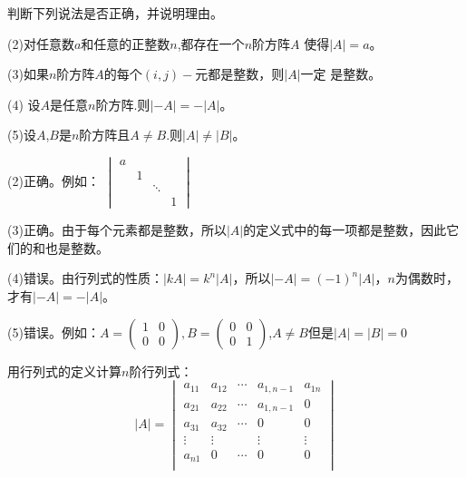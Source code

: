\documentclass[a4paper]{report}
\begin{document}
\EX 判断下列说法是否正确，并说明理由。

(2)对任意数$a$和任意的正整数$n$,都存在一个$n$阶方阵$A$
使得$|A|=a$。

(3)如果$n$阶方阵$A$的每个$(i,j)-$元都是整数，则$|A|$一定
是整数。

(4) 设$A$是任意$n$阶方阵.则$|-A|=-|A|$。

(5)设$A$,$B$是$n$阶方阵且$A\neq B$.则$|A|\neq |B|$。

\begin{jie}
(2)正确。例如：
$
\begin{vmatrix}
 a&&&\\
 &1&&\\
 &&\ddots&\\
 &&&1
\end{vmatrix}$

(3)正确。由于每个元素都是整数，所以$|A|$的定义式中的每一项都是整数，因此它们的和也是整数。

(4)错误。由行列式的性质：$|kA|=k^{n}|A|$，所以$|-A|=(-1)^n|A|$，$n$为偶数时，才有$|-A|=-|A|$。

(5)错误。例如：$A=
\begin{pmatrix}
1&0\\
0&0
\end{pmatrix},B=
\begin{pmatrix}
0&0\\
0&1
\end{pmatrix}
$,$A\neq B$但是$|A|=|B|=0$
\end{jie}

\EX 用行列式的定义计算$n$阶行列式：
\begin{equation*}
|A|=
\begin{vmatrix}
a_{11}&a_{12}&\cdots&a_{1,n-1}&a_{1n}\\
a_{21}&a_{22}&\cdots&a_{1,n-1}&0\\
a_{31}&a_{32}&\cdots&0&0\\
\vdots&\vdots&&\vdots&\vdots\\
a_{n1}&0&\cdots&0&0\\
\end{vmatrix}
\end{equation*}
\end{document}
